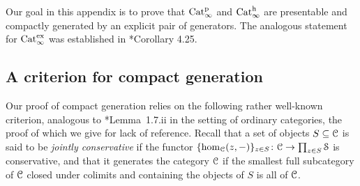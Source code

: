 

Our goal in this appendix is to prove that $\mathrm{Cat}^{\mathrm p}_\infty$ and $\mathrm{Cat}^\mathrm{h}_\infty$ are presentable and compactly generated by an explicit pair of generators. The analogous statement for $\mathrm{Cat}_\infty^{\mathrm{ex}}$ was established in \cite{BGT}*{Corollary 4.25}.


\subsection{A criterion for compact generation}
\label{subsec:criterion}%



Our proof of compact generation relies on the following rather well-known criterion, analogous to \cite{MakkaiPitts}*{Lemma~1.7.ii} in the setting of ordinary categories, the proof of which we give for lack of reference. 
Recall that a set of objects $S\subseteq\mathcal C$ is said to be \emph{jointly conservative} if the functor $\{\operatorname{hom}_\mathcal C(z,-)\}_{z\in S}\colon \mathcal C\to \prod_{z\in S}\mathcal S$ is conservative,
and that it generates the category $\mathcal C$ if the smallest full subcategory of $\mathcal C$ closed under colimits and containing the objects of $S$ is all of $\mathcal C$.

